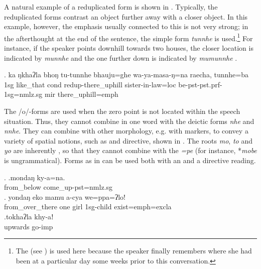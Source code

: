 A natural example of a reduplicated form is shown in \Next. Typically, the reduplicated forms contrast an object further away with a closer object. In this example, however, the emphasis usually connected to this  is not very strong;  in the afterthought at  the end of the sentence, the simple form \emph{tunnhe} is used.\footnote{The  (see )  is used here because the speaker finally remembers where she had been at a particular day some weeks prior to this conversation.} For instance, if the speaker points downhill towards two houses, the closer location is indicated by \emph{munnhe}  and the one further down is indicated by \emph{mumunnhe} . 

	\exg. ka  ŋkhaʔla bhoŋ tu-tunnhe         bhauju=ghe               wa-ya-masa-ŋ=na                        raecha, tunnhe=ba\\
	{\sc 1sg} like\_that {\sc cond} {\sc redup}-there\_uphill sister-in-law{\sc =loc} be{\sc -pst-pst.prf-1sg=nmlz.sg} {\sc mir} there\_uphill{\sc =emph}\\
 


The /o/-forms are used when the zero point is not located within the speech situation. Thus, they cannot combine in one word with the deictic forms \emph{nhe} and \emph{nnhe}. They can combine with other morphology, e.g. with  markers, to convey a variety of spatial notions, such as  and directive, shown in \Next. The roots \emph{mo}, \emph{to} and \emph{yo} are inherently , so that they cannot combine with the  \emph{=pe} (for instance, *\emph{mobe} is ungrammatical). Forms as in \Next[a] can be used both with an  and a directive reading.

\ex. \ag.mondaŋ ky-a=na.\\
from\_below come\_up{\sc [3sg]-pst=nmlz.sg}\\
\bg. yondaŋ    eko mamu a-cya            we=ppa=ʔlo!\\
from\_over\_there one girl {\sc 1sg-}child exist{\sc [3sg;npst]=emph=excla}\\
 
\bg.tokhaʔla khy-aǃ\\
upwards go{\sc -imp}\\

